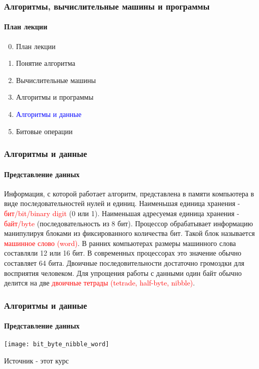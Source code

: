 \documentclass[aspectratio=169]{beamer}
\begin{document}
\begin{frame}
\frametitle{Алгоритмы, вычислительные машины и программы}
\framesubtitle{План лекции}

\begin{enumerate}
  \setcounter{enumi}{-1}
  \item{План лекции}
  \item{Понятие алгоритма}
  \item{Вычислительные машины}
  \item{Алгоритмы и программы}
  \item{\textcolor{blue}{Алгоритмы и данные}}
  \item{Битовые операции}

\end{enumerate}
\end{frame}

\begin{frame}
\frametitle{Алгоритмы и данные}
\framesubtitle{Представление данных}
\justifying
\small

Информация, с которой работает алгоритм, представлена в памяти компьютера в виде последовательностей нулей и единиц. \newline\newline Наименьшая единица хранения - \textcolor{red}{бит/bit/binary digit} (0 или 1). \newline Наименьшая адресуемая единица хранения - \textcolor{red}{байт/byte} (последовательность из 8 бит).\newline\newline
Процессор обрабатывает информацию манипулируя блоками из фиксированного количества бит. Такой блок называется \textcolor{red}{машинное слово (word)}. В ранних компьютерах размеры машинного слова составляли 12 или 16 бит. В современных процессорах это значение обычно составляет 64 бита.\newline\newline
Двоичные последовительности достаточно громоздки для восприятия человеком. Для упрощения работы с данными один байт обычно делится на две \textcolor{red}{двоичные тетрады (tetrade, half-byte, nibble)}.

\end{frame}

\begin{frame}
\frametitle{Алгоритмы и данные}
\framesubtitle{Представление данных}
\justifying
\small
\centering
\texttt{[image: bit\_byte\_nibble\_word]}

\scriptsize Источник - этот курс

\end{frame}
\end{document}
